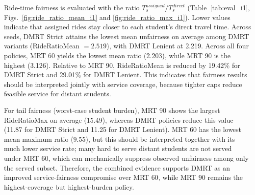 \documentclass[journal]{IEEEtran}
\begin{document}
\begin{table}[t]
\caption{STOP-SELECTION METRICS, MEAN OVER SEEDS}
\label{tab:stop_metrics_i1}
\centering
\small
\setlength{\tabcolsep}{8pt}
\renewcommand{\arraystretch}{1.08}
\end{table}

Ride-time fairness is evaluated with the ratio
$T_s^{assigned}/T_s^{direct}$ (Table~\ref{tab:eval_i1},
Figs.~\ref{fig:ride_ratio_mean_i1} and
\ref{fig:ride_ratio_max_i1}). Lower values indicate that assigned
rides stay closer to each student's direct travel time.
Across seeds, DMRT Strict attains the lowest mean unfairness
on average among DMRT variants (RideRatioMean $=2.519$), with
DMRT Lenient at 2.219. Across all four policies, MRT 60 yields
the lowest mean ratio (2.203), while MRT 90 is the highest
(3.126). Relative to MRT 90, RideRatioMean is reduced by 19.42\%
for DMRT Strict and 29.01\% for DMRT Lenient. This indicates that
fairness results should be interpreted
jointly with service coverage, because tighter caps reduce feasible
service for distant students.

For tail fairness (worst-case student burden), MRT 90 shows the
largest RideRatioMax on average (15.49), whereas DMRT policies reduce
this value (11.87 for DMRT Strict and 11.25 for DMRT Lenient).
MRT 60 has the lowest mean maximum ratio (9.55), but this should
be interpreted together with its much lower service rate; many
hard to serve distant students are not served under MRT 60, which
can mechanically suppress observed unfairness among only the served
subset. Therefore, the combined evidence supports DMRT as an
improved service-fairness compromise over MRT 60, while MRT 90
remains the highest-coverage but highest-burden policy.
\end{document}

